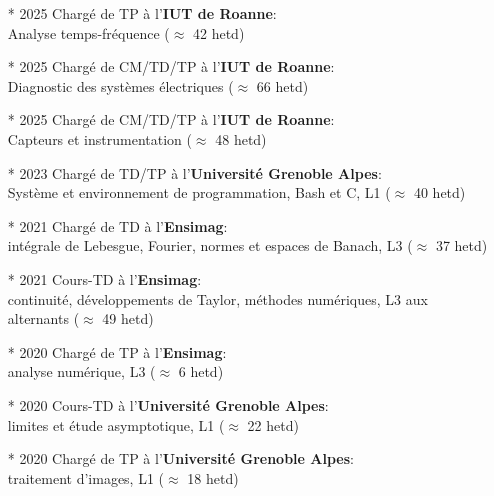 {	\begin{itemize}
		\setlength\itemsep{3mm}
		\item[*] 2025 Chargé de TP à l'\textbf{IUT de Roanne}:\\
		Analyse temps-fréquence ($\approx$ 42 hetd)
		\item[*] 2025 Chargé de CM/TD/TP à l'\textbf{IUT de Roanne}:\\
		Diagnostic des systèmes électriques ($\approx$ 66 hetd)
		\item[*] 2025 Chargé de CM/TD/TP à l'\textbf{IUT de Roanne}:\\
		Capteurs et instrumentation ($\approx$ 48 hetd)
		\item[*] 2023 Chargé de TD/TP à l'\textbf{Université Grenoble Alpes}:\\
		Système et environnement de programmation, Bash et C, L1 ($\approx$ 40 hetd)
		\item[*] 2021 Chargé de TD à l'\textbf{Ensimag}:\\
		intégrale de Lebesgue, Fourier, normes et espaces de Banach, L3 ($\approx$ 37 hetd)
		\item[*] 2021 Cours-TD à l'\textbf{Ensimag}:\\
		continuité, développements de Taylor, méthodes numériques, L3 aux alternants ($\approx$ 49 hetd)
		\item[*] 2020 Chargé de TP à l'\textbf{Ensimag}:\\ analyse numérique, L3 ($\approx$ 6 hetd)
		\item[*] 2020 Cours-TD à l'\textbf{Université Grenoble Alpes}:\\
		limites et étude asymptotique, L1 ($\approx$ 22 hetd)
		\item[*] 2020 Chargé de TP à l'\textbf{Université Grenoble Alpes}:\\
		traitement d'images, L1 ($\approx$ 18 hetd)
	\end{itemize}
	
	\vspace{5mm}
	
}
